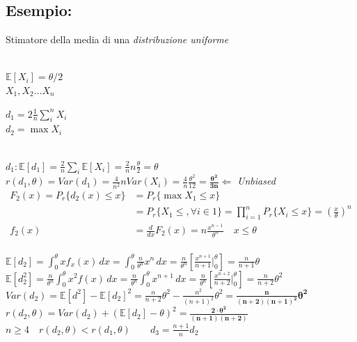 \documentclass[]{article}
\newcommand{\ev}{\mathbb{E}[X]}
\renewcommand{\ev}[1]{\mathbb{E}[#1]}
\begin{document}
    \subsection{Esempio:} Stimatore della media di una \textit{distribuzione uniforme} \\\\
    \begin{minipage}{0.4\textwidth}
        $\ev{X_i} = \theta / 2$ \\
        $X_1, X_2 \ldots X_n$
    \end{minipage}
    \begin{minipage}{0.4\textwidth}
        $d_1 = 2 \frac{1}{n} \sum_{i}^{n} X_i$ \\
        $d_2 = \max X_i$
    \end{minipage} \\[4ex]
    $d_1 : \ev{d_1} = \frac{2}{n} \sum_{i}^{} \ev{X_i} = \frac{2}{n} n \frac{\theta}{2} = \theta$ \\
    $r(d_1, \theta) = Var(d_1) = \frac{4}{n^2} n Var(X_i) = \frac{4}{n} \frac{\theta^2}{12} = \boldsymbol{\frac{\theta^2}{3n}} \Leftarrow$ \textit{Unbiased} \\[4ex]
    \begin{equation*}
        \begin{split}
            F_2(x) = P_r \{ d_2(x) \leq x \} &= P_r \{ \max X_1 \leq x \} \\
            &= P_r \{ X_1 \leq, \forall i \in 1 \} = \prod_{i = 1}^{n} P_r \{ X_i \leq x \} = (\frac{x}{\theta})^n \\
            f_2(x) &= \frac{d}{dx} F_2(x) = n \frac{x^{n-1}}{\theta^n} \quad x \leq \theta
        \end{split}
    \end{equation*} \\[6ex]
    $\displaystyle \ev{d_2} = \int_{0}^{\theta} x f_x(x) \, dx = \int_{0}^{\theta} \frac{n}{\theta^n} x^n \, dx = \frac{n}{\theta^n} \left[ \frac{x^{n+1}}{n+1} \bigg\rvert_{0}^{\theta}\right] = \frac{n}{n+1} \theta$ \\[2ex]
    $\displaystyle \ev{d_2^2} = \frac{n}{\theta^n} \int_{0}^{\theta} x^2 f(x) \, dx = \frac{n}{\theta^n} \int_{0}^{\theta} x^{n+1} \, dx = \frac{n}{\theta^n} \left[ \frac{x^{n+2}}{n+2} \bigg\rvert_{0}^{\theta}\right] = \frac{n}{n+2} \theta^2$ \\[2ex]
    $Var(d_2) = \ev{d^2} - \ev{d_2}^2 = \frac{n}{n+2}\theta^2 - \frac{n^2}{(n+1)^2} \theta^2 = \boldsymbol{\frac{n}{(n+2)(n+1)^2} \theta^2}$ \\[4ex]
    $r(d_2, \theta) = Var(d_2) + (\ev{d_2} - \theta)^2 = \boldsymbol{\frac{2 \cdot \theta^2}{(n+1)(n+2)}}$ \\[4ex]
    $n \geq 4 \quad r(d_2, \theta) < r(d_1, \theta) \quad \quad d_3 = \frac{n+1}{n} d_2$
\end{document}
